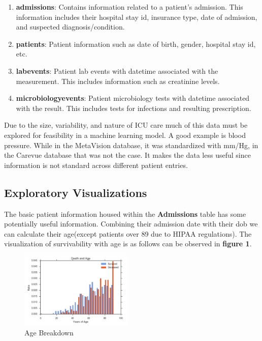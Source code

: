 \documentclass[11pt]{article}
\begin{document}
	\begin{enumerate}
		\item \textbf{admissions}: Contains information related to a patient's admission. This information includes their hospital stay id, insurance type, date of admission, and suspected diagnosis/condition.
		\item \textbf{patients}: Patient information such as date of birth, gender, hospital stay id, etc. 
		\item \textbf{labevents}: Patient lab events with datetime associated with the measurement. This includes information such as creatinine levels.
		\item \textbf{microbiologyevents}: Patient microbiology tests with datetime associated with the result. This includes tests for infections and resulting prescription.
	\end{enumerate}
	
	Due to the size, variability, and nature of ICU care much of this data must be explored for feasibility in a machine learning model. A good example is blood pressure. While in the MetaVision database, it was standardized with mm/Hg, in the Carevue database that was not the case. It makes the data less useful since information is not standard across different patient entries.
	
	\subsection{Exploratory Visualizations}
	The basic patient information housed within the \textbf{Admissions} table has some potentially useful information. Combining their admission date with their dob we can calculate their age(except patients over 89 due to HIPAA regulations). The visualization of survivability with age is as follows can be observed in \textbf{figure 1}.
	
	\begin{figure}
		\begin{center}
			\includegraphics[width=0.48\textwidth]{age.png}
		\end{center}
		\caption{Age Breakdown}
	\end{figure}
	
\end{document}
